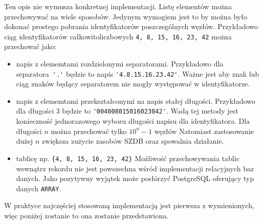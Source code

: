Ten opis nie wymusza konkretnej implementacji.
Listę elementów można przechowywać na wiele sposobów.
Jedynym wymogiem jest to by można było dokonać prostego pobrania identyfikatorów poszczególnych węzłów.
Przykładowo ciąg identyfikatorów całkowitoliczbowych \texttt{4, 8, 15, 16, 23, 42} można przechować jako:
\begin{itemize}
 \item napis z elememtami rozdzielonymi separatorami. 
    Przykładowo dla separatora~\verb|'.'| będzie to napis \verb|'4.8.15.16.23.42'|. 
    Ważne jest aby znak lub ciąg znaków będący separatorem nie mogły występować w identyfikatorze.
 \item napis z elememtami przekształconymi na napis stałej długości. 
    Przykładowo dla długości 3 będzie to \verb|'004008015016023042'|.
    Wadą tej metody jest konieczność jednorazowego wyboru długości napisu dla identyfikatora.
    Dla długości $n$ można przechować tylko $10^n-1$ węzłów%
    Natomiast zastosowanie dużej $n$ zwiększa zużycie zasobów SZDB oraz spowalnia działanie.
 \item tablicę  np. \verb|{4, 8, 15, 16, 23, 42}|
    Możliwość przechowywania tablic wewnątrz rekordu nie jest powszechna wśród implementacji relacyjnych baz danych.
    Jako pozytywny wyjątek może posłórzyć PostgreSQL oferujący typ danych \verb|ARRAY|.
\end{itemize}

W praktyce najczęściej stosowaną implementacją jest pierwsza z wymienionych,
więc poniżej zostanie to ona zostanie przedstawiona.








